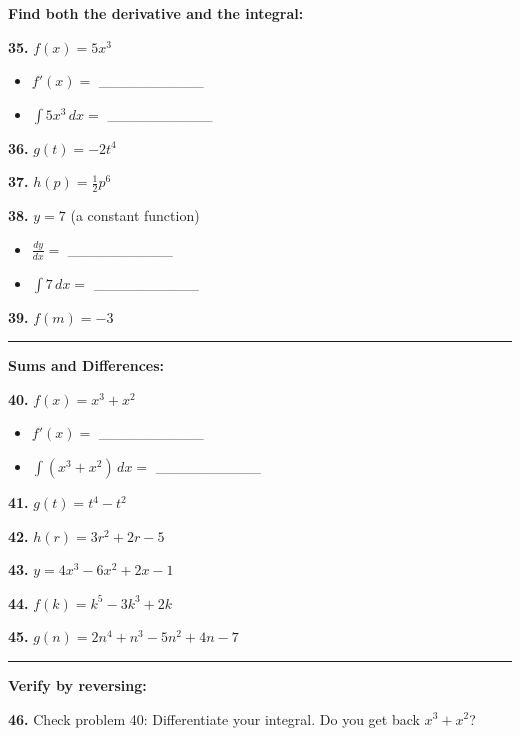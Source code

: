 \documentclass[
  11pt,
]{article}
\providecommand{\tightlist}{%
  \setlength{\itemsep}{0pt}\setlength{\parskip}{0pt}}
\begin{document}
\textbf{Find both the derivative and the integral:}

\textbf{35.} \(f(x) = 5x^3\)

\begin{itemize}
\tightlist
\item
  \(f'(x) ={}\) \_\_\_\_\_\_\_\_\_\_
\item
  \(\int 5x^3 \, dx ={}\) \_\_\_\_\_\_\_\_\_\_
\end{itemize}

\textbf{36.} \(g(t) = -2t^4\)

\textbf{37.} \(h(p) = \frac{1}{2}p^6\)

\textbf{38.} \(y = 7\) (a constant function)

\begin{itemize}
\tightlist
\item
  \(\frac{dy}{dx} ={}\) \_\_\_\_\_\_\_\_\_\_
\item
  \(\int 7 \, dx ={}\) \_\_\_\_\_\_\_\_\_\_
\end{itemize}

\textbf{39.} \(f(m) = -3\)

\begin{center}\rule{0.5\linewidth}{0.5pt}\end{center}

\textbf{Sums and Differences:}

\textbf{40.} \(f(x) = x^3 + x^2\)

\begin{itemize}
\tightlist
\item
  \(f'(x) ={}\) \_\_\_\_\_\_\_\_\_\_
\item
  \(\int (x^3 + x^2) \, dx ={}\) \_\_\_\_\_\_\_\_\_\_
\end{itemize}

\textbf{41.} \(g(t) = t^4 - t^2\)

\textbf{42.} \(h(r) = 3r^2 + 2r - 5\)

\textbf{43.} \(y = 4x^3 - 6x^2 + 2x - 1\)

\textbf{44.} \(f(k) = k^5 - 3k^3 + 2k\)

\textbf{45.} \(g(n) = 2n^4 + n^3 - 5n^2 + 4n - 7\)

\begin{center}\rule{0.5\linewidth}{0.5pt}\end{center}

\textbf{Verify by reversing:}

\textbf{46.} Check problem 40: Differentiate your integral. Do you get
back \(x^3 + x^2\)?
\end{document}
